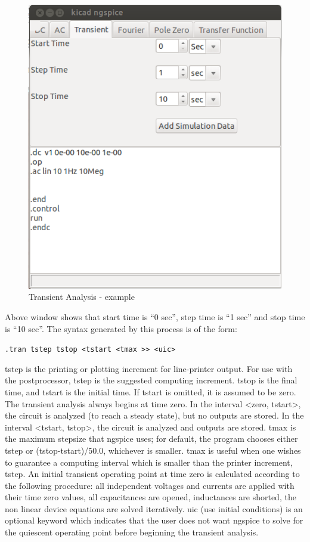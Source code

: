 \begin{figure}
\centering
\includegraphics[width=\textwidth]{figures/7}
\caption{Transient Analysis - example}
\label{7}
\end{figure}
Above window shows that start time is “0 sec”, step time is “1 sec” and stop time is “10 sec”.
The syntax generated by this process is of the form:

{\tt .tran tstep tstop <tstart <tmax >>  <uic>}

tstep is the printing or plotting increment for line-printer output. For use with the postprocessor, tstep is the suggested computing increment. tstop is the final time, and tstart is the initial time. If tstart is omitted, it is assumed to be zero. The transient analysis always begins at time zero. In the interval <zero, tstart>, the circuit is analyzed (to reach a steady state), but no outputs are stored. In the interval <tstart, tstop>, the circuit is analyzed and outputs are stored. tmax is the maximum stepsize that ngspice uses; for default, the program chooses either tstep or (tstop-tstart)/50.0, whichever is smaller. tmax is useful when one wishes to guarantee a computing interval which is smaller than the printer increment, tstep. An initial transient operating point at time zero is calculated according to the following procedure: all independent voltages and currents are applied with their time zero values, all capacitances are opened, inductances are shorted, the non linear device equations are solved iteratively. uic (use initial conditions) is an optional keyword which indicates that the user does not want ngspice to solve for the quiescent operating point before beginning the transient analysis. 

